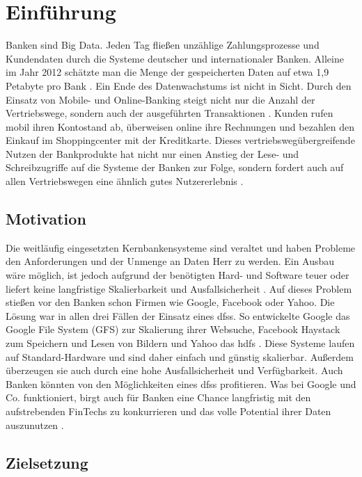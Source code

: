 \documentclass[12pt,oneside,a4paper,parskip]{scrbook}
\begin{document}
\chapter{Einführung}\label{ch:intro}
Banken sind Big Data. Jeden Tag fließen unzählige Zahlungsprozesse und Kundendaten durch die Systeme deutscher und internationaler Banken. Alleine im Jahr 2012 schätzte man die Menge der gespeicherten Daten auf etwa 1,9 Petabyte pro Bank \cite{datanami}. Ein Ende des Datenwachstums ist nicht in Sicht. Durch den Einsatz von Mobile- und Online-Banking steigt nicht nur die Anzahl der Vertriebswege, sondern auch der ausgeführten Transaktionen \cite{DBBigData}. Kunden rufen mobil ihren Kontostand ab, überweisen online ihre Rechnungen und bezahlen den Einkauf im Shoppingcenter mit der Kreditkarte. Dieses vertriebswegübergreifende Nutzen der Bankprodukte hat nicht nur einen Anstieg der Lese- und Schreibzugriffe auf die Systeme der Banken zur Folge, sondern fordert auch auf allen Vertriebswegen eine ähnlich gutes Nutzererlebnis \cite{bankwirtschaft}.

\section{Motivation}
Die weitläufig eingesetzten Kernbankensysteme sind veraltet und haben Probleme den Anforderungen und der Unmenge an Daten Herr zu werden. Ein Ausbau wäre möglich, ist jedoch aufgrund der benötigten Hard- und Software teuer oder liefert keine langfristige Skalierbarkeit und Ausfallsicherheit \cite{herzKernbankensystem}. Auf dieses Problem stießen vor den Banken schon Firmen wie Google, Facebook oder Yahoo. Die Lösung war in allen drei Fällen der Einsatz eines \acp{dfs}. So entwickelte Google das Google File System (GFS)\cite{GFS} zur Skalierung ihrer Websuche, Facebook Haystack \cite{haystack} zum Speichern und Lesen von Bildern und Yahoo das \ac{hdfs} \cite{hdfs}. Diese Systeme laufen auf Standard-Hardware und sind daher einfach und günstig skalierbar. Außerdem überzeugen sie auch durch eine hohe Ausfallsicherheit und Verfügbarkeit. Auch Banken könnten von den Möglichkeiten eines \acp{dfs} profitieren. Was bei Google und Co. funktioniert, birgt auch für Banken eine Chance langfristig mit den aufstrebenden FinTechs zu konkurrieren und das volle Potential ihrer Daten auszunutzen \cite{wiki:fintech}.

\section{Zielsetzung}
\end{document}
